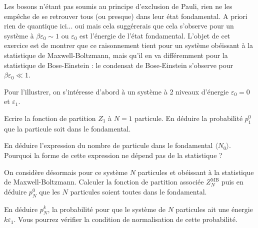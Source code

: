 Les bosons n'étant pas soumis au principe d'exclusion de Pauli, rien ne les empêche de se retrouver tous (ou presque) dans leur état fondamental. A priori rien de quantique ici... oui mais cela suggérerais que cela s'observe pour un système à $\beta \varepsilon_0 \sim 1$ ou $\varepsilon_0$ est l'énergie de l'état fondamental. L'objet de cet exercice est de montrer que ce raisonnement tient pour un système obéissant à la statistique de Maxwell-Boltzmann, mais qu'il en va différemment pour la statistique de Bose-Einstein : le condensat de Bose-Einstein s'observe pour $\beta \varepsilon_0 \ll 1$.

\medskip

Pour l'illustrer, on s'intéresse d'abord à un système à 2 niveaux d'énergie $\varepsilon_0 = 0$ et $\varepsilon_1$.

\bigskip
{}

\question
Ecrire la fonction de partition $Z_1$ à $N=1$ particule. En déduire la probabilité $p_1^0$ que la particule soit dans le fondamental.

\question
En déduire l'expression du nombre de particule dans le fondamental $\langle N_0 \rangle$. Pourquoi la forme de cette expression ne dépend pas de la statistique ?

\question
On considère désormais pour ce système $N$ particules  et  obéissant à la statistique de Maxwell-Boltzmann. Calculer la fonction de partition associée $Z_N^{\mathrm{MB}}$ puis en déduire $p_N^0$ que les $N$ particules soient toutes dans le fondamental.

\question
En déduire $p_N^k$, la probabilité pour que le système de $N$ particules ait une énergie $k \varepsilon_1$. Vous pourrez vérifier la condition de normalisation de cette probabilité.

